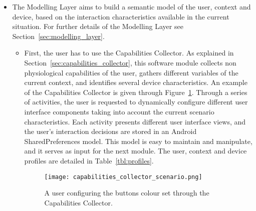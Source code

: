 \begin{itemize}
  \item The Modelling Layer aims to build a semantic model of the user, context
  and device, based on the interaction characteristics available in the current
  situation. For further details of the Modelling Layer see Section~\ref{sec:modelling_layer}.
  
  \begin{itemize}
    \item First, the user has to use the Capabilities Collector. As explained in 
    Section~\ref{sec:capabilities_collector}, this software module collects non 
    physiological capabilities of the user, gathers different variables of the 
    current context, and identifies several device characteristics. An example of 
    the Capabilities Collector is given through 
    Figure~\ref{fig:capabilities_collector_scenario}. Through a series of
    activities, the user is requested to dynamically configure different user 
    interface components taking into account the current scenario characteristics. 
    Each activity presents different user interface views, and the user's
    interaction decisions are stored in an Android SharedPreferences model.
    This model is easy to maintain and manipulate, and it serves as input for
    the next module. The user, context and device profiles are detailed in 
    Table~\ref{tbl:profiles}.
    
\begin{figure}
\centering
\texttt{[image: capabilities\_collector\_scenario.png]}
\caption{A user configuring the buttons colour set through the Capabilities Collector.}
\label{fig:capabilities_collector_scenario}
\end{figure}
    

\end{itemize}
\end{itemize}
